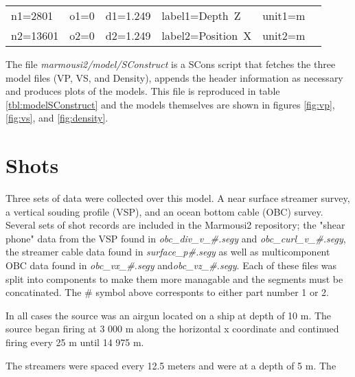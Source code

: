 {
\begin{tabular}[t]{|llllll|}
        \hline
        n1=2801    &   o1=0 &   d1=1.249    &    label1=Depth\ Z     &  unit1=m &  \\
        n2=13601   &   o2=0 &   d2=1.249    &    label2=Position\ X  &  unit2=m &  \\
        \hline
\end{tabular}
}


The file \emph{marmousi2\slash model\slash SConstruct} is a SCons script that fetches the three model files (VP, VS, and Density), 
appends the header information as necessary and produces plots of the models.  This file is reproduced in table 
\ref{tbl:modelSConstruct} and the models themselves are shown in figures \ref{fig:vp}, \ref{fig:vs}, and \ref{fig:density}.   

{
\tiny

\normalsize
}


\section{Shots}
Three sets of data were collected over this model.  A near surface streamer survey, a vertical souding profile (VSP), and 
an ocean bottom cable (OBC) survey.  Several sets of shot records are included in the Marmousi2 repository; 
the "shear phone" data from the VSP found in \emph{obc\_div\_v\_\#.segy} and \emph{obc\_curl\_v\_\#.segy}, the 
streamer cable data found in \emph{surface\_p\#.segy} as well as multicomponent OBC data found in \emph{obc\_vx\_\#.segy} 
and\emph{obc\_vz\_\#.segy}.  Each of these files was split into components to make them more managable and the segments must be
concatinated.  The  \# symbol above corresponts to either part number 1 or 2. 

In all cases the source was an airgun located on a ship at depth of 10 m.  The source began firing at 3 000 m along the horizontal x 
coordinate and continued firing every 25 m until 14 975 m.  

The streamers were spaced every 12.5 meters and were at a depth of 5 m.  The 

